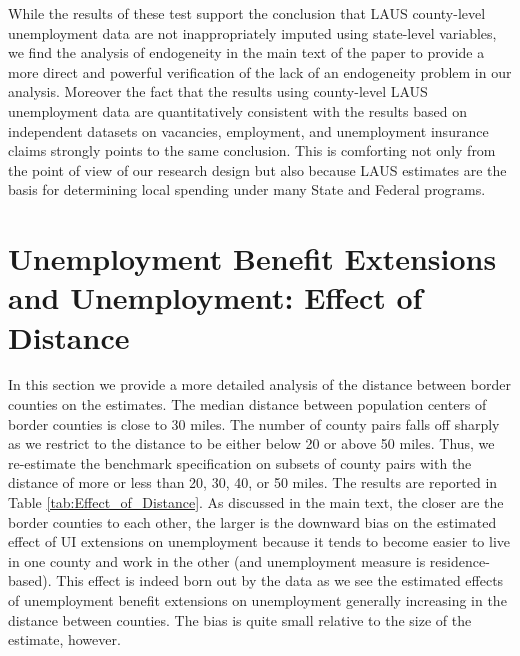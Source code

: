 \documentclass[12pt]{article}
\newcommand{\1}{\mathbf{1}}
\begin{document}
\begin{appendix}
While the results of these test support the conclusion that LAUS county-level unemployment data are not inappropriately imputed using state-level variables, we find the analysis of endogeneity in the main text of the paper to provide a more direct and powerful verification of the lack of an endogeneity problem in our analysis. Moreover the fact that the results using county-level LAUS unemployment data are quantitatively consistent with the results based on independent datasets on vacancies, employment, and unemployment insurance claims strongly points to the same conclusion. This is comforting not only from the point of view of our research design but also because LAUS estimates are the basis for determining local spending under many State and Federal programs.




\clearpage
\section{Unemployment Benefit Extensions and Unemployment: Effect of Distance}
\label{app:benefits_and_unemployment_distance}
In this section we provide a more detailed analysis of the distance between border counties on the estimates. The median distance between population centers of border counties is close to 30 miles. The number of county pairs falls off sharply as we restrict to the distance to be either below 20 or above 50 miles. Thus, we re-estimate the benchmark specification on subsets of county pairs with the distance of more or less than 20, 30, 40, or 50 miles. The results are reported in Table \ref{tab:Effect_of_Distance}. As discussed in the main text, the closer are the border counties to each other, the larger is the downward bias on the estimated effect of UI extensions on unemployment because it tends to become easier to live in one county and work in the other (and unemployment measure is residence-based). This effect is indeed born out by the data as we see the estimated effects of unemployment benefit extensions on unemployment generally increasing in the distance between counties. The bias is quite small relative to the size of the estimate, however.


\end{appendix}
\end{document}
